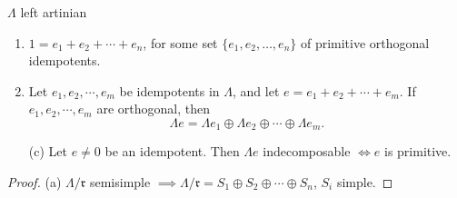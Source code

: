 \begin{prop}\label{prop:39}
$\Lambda$ left artinian
\begin{enumerate}[\rm(a)]
\item $1 = e_1 +e_2 + \cdots + e_n$, for some set
  $\{e_1,e_2,\ldots,e_n\}$ of primitive orthogonal idempotents. 
\item Let $e_1, e_2, \cdots, e_m$ be idempotents in $\Lambda$, and let
  $e = e_1 + e_2 + \cdots + e_m$.  If $e_1, e_2, \cdots, e_m$ are
  orthogonal, then 
\[\Lambda e = \Lambda e_1 \oplus \Lambda e_2 \oplus
  \cdots \oplus \Lambda e_m.\]
\item[(c)] Let $e\neq 0$ be an idempotent. Then $\Lambda e$
  indecomposable $\iff e$ is primitive. 
\end{enumerate}
\end{prop}
\begin{proof}
(a) $\Lambda / \mathfrak{r}$ semisimple $\implies \Lambda /
\mathfrak{r} = S_1 \oplus S_2 \oplus \cdots \oplus S_n$, $S_i$ simple.


\end{proof}
